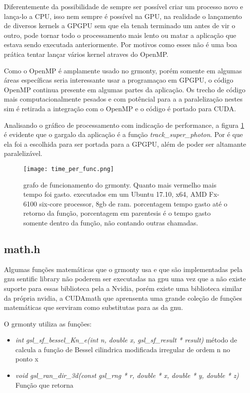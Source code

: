     Diferentemente da possibilidade de sempre ser possível criar um processo novo e lança-lo a CPU, isso nem sempre é possível na GPU, na realidade o lançamento de diversos kernels a GPGPU sem que ela tenah terminado um antes de vir o outro, pode tornar todo o processamento mais lento ou matar a aplicação que estava sendo executada anteriormente. Por motivos como esses não é uma boa prática tentar lançar vários kernel atraves do OpenMP.

    Como o OpenMP é amplamente usado no grmonty, porém somente em algumas áreas específicas seria interessante usar a programaçao em GPGPU, o código OpenMP continua presente em algumas partes da aplicação. Os trecho de código mais computacionalmente pesados e com potêncial para a a paralelização nestes sim é retirada a integração com o OpenMP e o código é portado para CUDA.

    Analisando o gráfico de processamento com indicação de performance, a figura \ref{fig:grmonty-performance} é evidente que o gargalo da aplicação é a função \textit{track\_super\_photon}. Por é que ela foi a escolhida para ser portada para a GPGPU, além de poder ser altamante paralelizável.

    \begin{figure}[!h]
      \centering
      \texttt{[image: time\_per\_func.png]}
      \caption{grafo de funcionamento do grmonty. Quanto mais vermelho mais tempo foi gasto. executados em um Ubuntu 17.10, x64, AMD Fx-6100 six-core processor, 8gb de ram. porcentagem tempo gasto até o retorno da função, porcentagem em parentesis é o tempo gasto somente dentro da função, não contando outras chamadas.}
      \label{fig:grmonty-performance}
    \end{figure}

  \subsection{math.h}
    Algumas funções matemáticas que o grmonty usa e que são implementadas pela gnu sentific library não poderem ser executadas na gpu uma vez que a não existe suporte para essas biblioteca pela a Nvidia, porém existe uma biblioteca similar da própria nvidia, a CUDAmath que aprensenta uma grande coleção de funções matemáticas que serviram como substitutas para as da gnu.

    O grmonty utiliza as funções:
    \begin{itemize}
      \item \textit{int gsl\_sf\_bessel\_Kn\_e(int n, double x, gsl_sf_result * result)} método de calcula a função de Bessel cilindrica modificada irregular de ordem n no ponto x
      \item \textit{void gsl\_ran\_dir\_3d(const gsl_rng * r, double * x, double * y, double * z)} Função que retorna
    \end{itemize}


